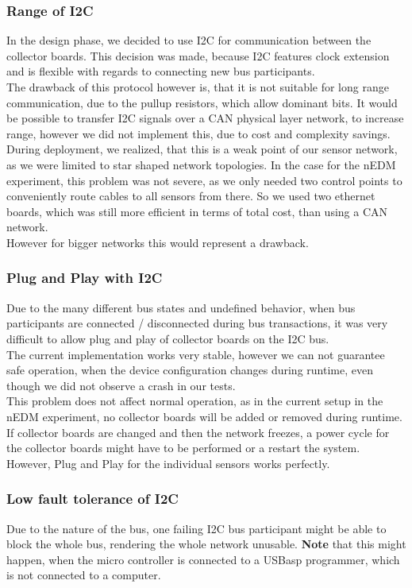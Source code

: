 \documentclass[a4paper]{scrreprt}
\begin{document}
\subsubsection{Range of I2C}
In the design phase, we decided to use I2C for communication between
the collector boards. This decision was made, because I2C features clock
extension and is flexible with regards to connecting new bus participants.\\
The drawback of this protocol however is, that it is not suitable for long
range communication, due to the pullup resistors, which allow dominant
bits. It would be possible to transfer I2C signals over a CAN physical layer
network, to increase range, however we did not implement this, due to
cost and complexity savings.\\
During deployment, we realized, that this is a weak point of our sensor
network, as we were limited to star shaped network topologies. In the case
for the nEDM experiment, this problem was not severe, as we only needed
two control points to conveniently route cables to all sensors from there.
So we used two ethernet boards, which was still more efficient in terms
of total cost, than using a CAN network.\\
However for bigger networks this would represent a drawback.
\subsubsection{Plug and Play with I2C}
Due to the many different bus states and undefined behavior, when bus
participants are connected / disconnected during bus transactions, it was
very difficult to allow plug and play of collector boards on the I2C bus.\\
The current implementation works very stable, however we can not guarantee
safe operation, when the device configuration changes during runtime, even though
we did not observe a crash in our tests.\\
This problem does not affect normal operation, as in the current setup in the
nEDM experiment, no collector boards will be added or removed during runtime.
If collector boards are changed and then the network freezes, a power cycle for the collector boards might have to be performed or a restart the system.
\\
However, Plug and Play for the individual sensors works perfectly.
\subsubsection{Low fault tolerance of I2C}
Due to the nature of the bus, one failing I2C bus participant might be able to
block the whole bus, rendering the whole network unusable.
\textbf{Note} that this
might happen, when the micro controller is connected to a USBasp programmer,
which is not connected to a computer.
\end{document}
